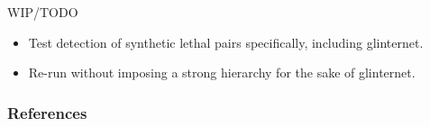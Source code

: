 \begin{frame}{WIP/TODO}
\begin{itemize}
	\item Test detection of synthetic lethal pairs specifically, including glinternet.
	\item Re-run without imposing a strong hierarchy for the sake of glinternet.
\end{itemize}
\end{frame}

\begin{frame}
\frametitle{References}
\printbibliography
\end{frame}




